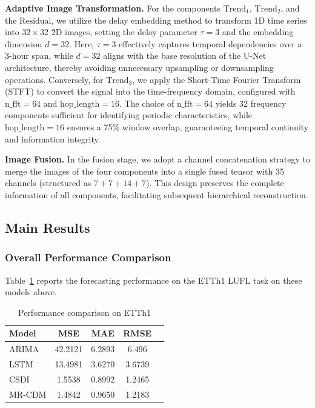 \textbf{Adaptive Image Transformation.} 
For the components $\text{Trend}_1$, $\text{Trend}_2$, and the $\text{Residual}$, we utilize the delay embedding method to transform 1D time series into $32 \times 32$ 2D images, setting the delay parameter $\tau=3$ and the embedding dimension $d=32$. Here, $\tau=3$ effectively captures temporal dependencies over a 3-hour span, while $d=32$ aligns with the base resolution of the U-Net architecture, thereby avoiding unnecessary upsampling or downsampling operations. Conversely, for $\text{Trend}_3$, we apply the Short-Time Fourier Transform (STFT) to convert the signal into the time-frequency domain, configured with $\text{n\_fft}=64$ and $\text{hop\_length}=16$. The choice of $\text{n\_fft}=64$ yields 32 frequency components sufficient for identifying periodic characteristics, while $\text{hop\_length}=16$ ensures a 75\% window overlap, guaranteeing temporal continuity and information integrity.

\textbf{Image Fusion.} 
In the fusion stage, we adopt a channel concatenation strategy to merge the images of the four components into a single fused tensor with 35 channels (structured as $7+7+14+7$). This design preserves the complete information of all components, facilitating subsequent hierarchical reconstruction.
\subsection{Main Results}

\subsubsection{Overall Performance Comparison}

Table~\ref{tab:main_results} reports the forecasting performance on the ETTh1 LUFL task on these models above.

\begin{table}[h]
\centering
\caption{Performance comparison on ETTh1}
\label{tab:main_results}
\begin{tabular}{lcccc}
\hline
Model & MSE & MAE & RMSE\\
\hline
ARIMA & {42.2121} & {6.2893} & {6.496}\\
LSTM & {13.4981} & {3.6270} & {3.6739}\\
CSDI & {1.5538} & {0.8992} & {1.2465}\\
MR-CDM & {1.4842} & {0.9650} & {1.2183}\\
\hline
\end{tabular}
\end{table}


